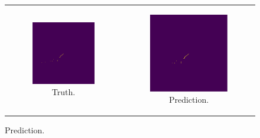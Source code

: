 \begin{figure}
	\begin{tabularx}{\textwidth}{cc}
		\begin{subfigure}[b]{0.49\textwidth}
			\centering
			\vspace{3mm}
			\includegraphics[width=\textwidth]{figures/unet_example_true.pdf}
			\caption {Truth.}
			\label{fig:unet_example_true}
		\end{subfigure} &
		\begin{subfigure}[b]{0.49\textwidth}
			\centering
			\vspace{3mm}
			\includegraphics[width=\textwidth]{figures/unet_example_pred.pdf}
			\caption {Prediction.}
			\label{fig:unet_example_pred}
		\end{subfigure}
	\end{tabularx}


\end{figure}
